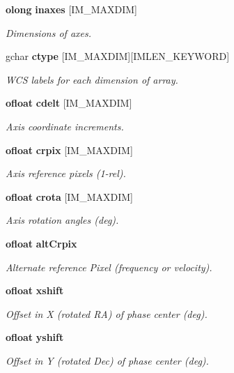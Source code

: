 \begin{CompactItemize}
{\bf olong} {\bf inaxes} [IM\_\-MAXDIM]
\begin{CompactList}\small\item\em Dimensions of axes. \item\end{CompactList}\item 
gchar {\bf ctype} [IM\_\-MAXDIM][IMLEN\_\-KEYWORD]
\begin{CompactList}\small\item\em WCS labels for each dimension of array. \item\end{CompactList}\item 
{\bf ofloat} {\bf cdelt} [IM\_\-MAXDIM]
\begin{CompactList}\small\item\em Axis coordinate increments. \item\end{CompactList}\item 
{\bf ofloat} {\bf crpix} [IM\_\-MAXDIM]
\begin{CompactList}\small\item\em Axis reference pixels (1-rel). \item\end{CompactList}\item 
{\bf ofloat} {\bf crota} [IM\_\-MAXDIM]
\begin{CompactList}\small\item\em Axis rotation angles (deg). \item\end{CompactList}\item 
{\bf ofloat} {\bf alt\-Crpix}
\begin{CompactList}\small\item\em Alternate reference Pixel (frequency or velocity). \item\end{CompactList}\item 
{\bf ofloat} {\bf xshift}
\begin{CompactList}\small\item\em Offset in X (rotated RA) of phase center (deg). \item\end{CompactList}\item 
{\bf ofloat} {\bf yshift}
\begin{CompactList}\small\item\em Offset in Y (rotated Dec) of phase center (deg). \item\end{CompactList}\item 

\end{CompactItemize}
